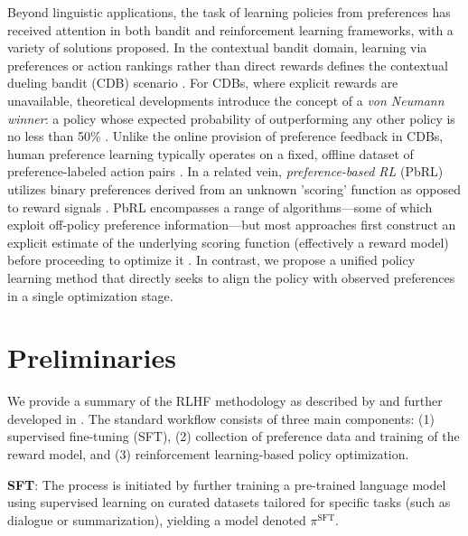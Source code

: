Beyond linguistic applications, the task of learning policies from preferences has received attention in both bandit and reinforcement learning frameworks, with a variety of solutions proposed. In the contextual bandit domain, learning via preferences or action rankings rather than direct rewards defines the contextual dueling bandit (CDB) scenario \citep{yue2012karmed, dudik2015contextual}. For CDBs, where explicit rewards are unavailable, theoretical developments introduce the concept of a \textit{von Neumann winner}: a policy whose expected probability of outperforming any other policy is no less than 50\% \citep{dudik2015contextual}. Unlike the online provision of preference feedback in CDBs, human preference learning typically operates on a fixed, offline dataset of preference-labeled action pairs \citep{yan2022human}. In a related vein, \textit{preference-based RL} (PbRL) utilizes binary preferences derived from an unknown 'scoring' function as opposed to reward signals \citep{BusaFekete2014, ruiz2023dueling}. PbRL encompasses a range of algorithms—some of which exploit off-policy preference information—but most approaches first construct an explicit estimate of the underlying scoring function (effectively a reward model) before proceeding to optimize it \citep{jain2013learning, BusaFekete2014, christiano2017deep, sadigh2017active, kupcsik2018learning}. In contrast, we propose a unified policy learning method that directly seeks to align the policy with observed preferences in a single optimization stage.

\section{Preliminaries}\label{section:prelims}

We provide a summary of the RLHF methodology as described by \citeauthor{ziegler2020finetuning} and further developed in \citep{stiennon2022learning, bai2022training, ouyang2022training}. The standard workflow consists of three main components: (1) supervised fine-tuning (SFT), (2) collection of preference data and training of the reward model, and (3) reinforcement learning-based policy optimization.

\textbf{SFT}: The process is initiated by further training a pre-trained language model using supervised learning on curated datasets tailored for specific tasks (such as dialogue or summarization), yielding a model denoted $\pi^\text{SFT}$.


